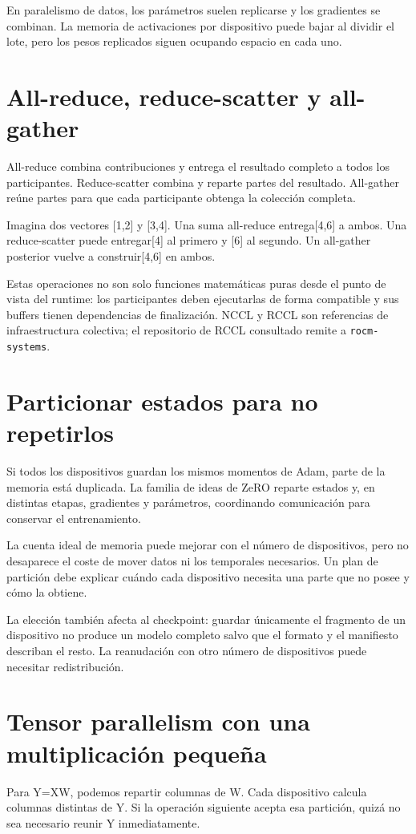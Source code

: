 \documentclass[12pt,a4paper,oneside]{report}
\begin{document}
En paralelismo de datos, los parámetros suelen replicarse y los gradientes se combinan. La memoria de activaciones por dispositivo puede bajar al dividir el lote, pero los pesos replicados siguen ocupando espacio en cada uno.

\section{All-reduce, reduce-scatter y all-gather}
All-reduce combina contribuciones y entrega el resultado completo a todos los participantes. Reduce-scatter combina y reparte partes del resultado. All-gather reúne partes para que cada participante obtenga la colección completa.

Imagina dos vectores [1,2] y [3,4]. Una suma all-reduce entrega[4,6] a ambos. Una reduce-scatter puede entregar[4] al primero y [6] al segundo. Un all-gather posterior vuelve a construir[4,6] en ambos.

Estas operaciones no son solo funciones matemáticas puras desde el punto de vista del runtime: los participantes deben ejecutarlas de forma compatible y sus buffers tienen dependencias de finalización. NCCL y RCCL son referencias de infraestructura colectiva; el repositorio de RCCL consultado remite a \texttt{rocm-systems}. \cite{nccl,rccl}

\section{Particionar estados para no repetirlos}
Si todos los dispositivos guardan los mismos momentos de Adam, parte de la memoria está duplicada. La familia de ideas de ZeRO reparte estados y, en distintas etapas, gradientes y parámetros, coordinando comunicación para conservar el entrenamiento. \cite{zero}

La cuenta ideal de memoria puede mejorar con el número de dispositivos, pero no desaparece el coste de mover datos ni los temporales necesarios. Un plan de partición debe explicar cuándo cada dispositivo necesita una parte que no posee y cómo la obtiene.

La elección también afecta al checkpoint: guardar únicamente el fragmento de un dispositivo no produce un modelo completo salvo que el formato y el manifiesto describan el resto. La reanudación con otro número de dispositivos puede necesitar redistribución.

\section{Tensor parallelism con una multiplicación pequeña}
Para Y=XW, podemos repartir columnas de W. Cada dispositivo calcula columnas distintas de Y. Si la operación siguiente acepta esa partición, quizá no sea necesario reunir Y inmediatamente.
\end{document}
